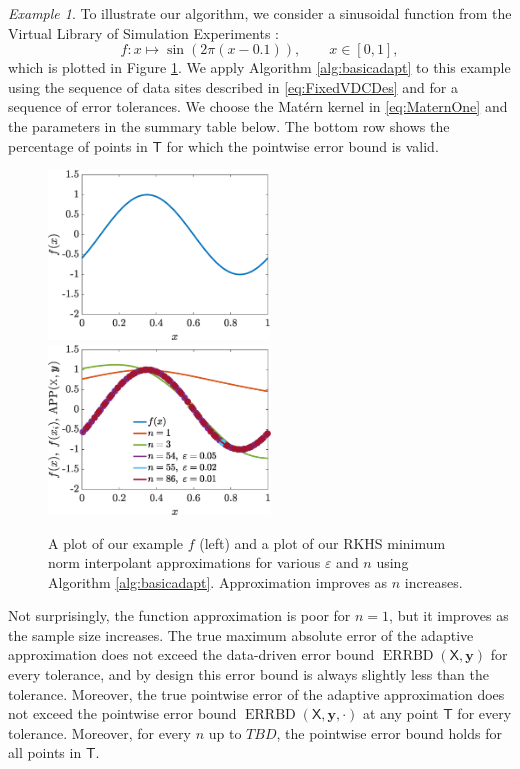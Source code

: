 \documentclass[]{mcom-l}
\theoremstyle{theorem}
\theoremstyle{remark}
\newtheorem{example}{Example}
\DeclareMathOperator{\errBd}{ERRBD}
\newcommand{\mT}{\mathsf{T}}
\newcommand{\mX}{\mathsf{X}}
\newcommand{\by}{{\boldsymbol{y}}}
\begin{document}
\begin{example}
	\label{ex:adpsamplesize}
	To illustrate our algorithm, we consider a sinusoidal function \cite{CurEtal88b} from the Virtual Library of Simulation Experiments \cite{VirLib17a}:
	\begin{equation}
	f: x \mapsto  \sin(2\pi(x-0.1)), \qquad x \in [0,1],
	\end{equation}
	which is plotted in Figure \ref{fig:ex1}.  We apply Algorithm \ref{alg:basicadapt} to this example using the sequence of data sites described in \eqref{eq:FixedVDCDes} and for a sequence of error tolerances.  We choose the Mat\'ern kernel in \eqref{eq:MaternOne} and the parameters in the summary table below.  The bottom row shows the percentage of points in $\mT$ for which the pointwise error bound is valid.
	
	
	
	\begin{figure}[H]
		\centering
		\includegraphics[height = 4.5cm]{ProgramsImages/CurrinSineFunPlot.eps} \qquad
		\includegraphics[height = 4.5cm]{ProgramsImages/Alg1_CurrinSineFun_Matern_adapt_th_EmpBayesAx_theta_1.eps}
		\caption{A plot of our example $f$ (left) and a plot of our RKHS minimum norm interpolant approximations for various $\varepsilon$ and  $n$ using Algorithm \ref{alg:basicadapt}.  Approximation improves as $n$ increases. \label{fig:ex1}}
	\end{figure}
	
Not surprisingly, the function approximation is poor for $n=1$, but it improves as the sample size increases.  The true  maximum absolute error of the adaptive approximation does not exceed the data-driven error bound $\errBd(\mX,\by)$ for every tolerance, and by design this error bound is always slightly less than the tolerance.  Moreover, the true pointwise error of the adaptive approximation does not exceed the pointwise error bound $\errBd(\mX,\by,\cdot)$ at any point $\mT$ for every tolerance.  Moreover, for every $n$ up to $TBD$, the pointwise error bound holds for all points in  $\mT$.
	
\end{example} 
\end{document}
